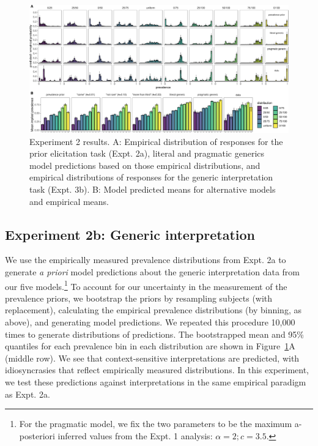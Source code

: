 \documentclass[floatsintext,doc]{apa6}
\let\rmarkdownfootnote\footnote%
\def\footnote{\protect\rmarkdownfootnote}
\begin{document}
\begin{figure}
\centering
\includegraphics{genint_files/figure-latex/priorManipulationResults-1.pdf}
\caption{\label{fig:priorManipulationResults}Experiment 2 results. A: Empirical distribution of responses for the prior elicitation task (Expt. 2a), literal and pragmatic generics model predictions based on those empirical distributions, and empirical distributions of responses for the generic interpretation task (Expt. 3b). B: Model predicted means for alternative models and empirical means.}
\end{figure}

\hypertarget{experiment-2b-generic-interpretation}{%
\subsection{Experiment 2b: Generic interpretation}\label{experiment-2b-generic-interpretation}}

We use the empirically measured prevalence distributions from Expt. 2a to generate \emph{a priori} model predictions about the generic interpretation data from our five models.\footnote{For the pragmatic model, we fix the two parameters to be the maximum a-posteriori inferred values from the Expt. 1 analysis: \(\alpha = 2; c = 3.5\).}
To account for our uncertainty in the measurement of the prevalence priors, we bootstrap the priors by resampling subjects (with replacement), calculating the empirical prevalence distributions (by binning, as above), and generating model predictions.
We repeated this procedure 10,000 times to generate distributions of predictions.
The bootstrapped mean and 95\% quantiles for each prevalence bin in each distribution are shown in Figure~\ref{fig:priorManipulationResults}A (middle row).
We see that context-sensitive interpretations are predicted, with idiosyncrasies that reflect empirically measured distributions.
In this experiment, we test these predictions against interpretations in the same empirical paradigm as Expt. 2a.
\end{document}
